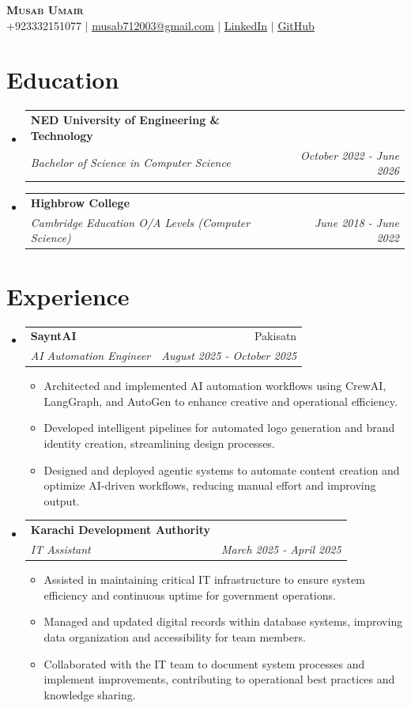 \documentclass[letterpaper,11pt]{article}
\makeatletter
\newcommand{\resumeItem}[1]{
  \item\small{
    {#1 \vspace{-2pt}}
  }
}
\newcommand{\resumeSubheading}[4]{
  \vspace{-2pt}\item
    \begin{tabular*}{0.97\textwidth}[t]{l@{\extracolsep{\fill}}r}
      \textbf{#1} & #2 \\
      \textit{\small#3} & \textit{\small #4} \\
    \end{tabular*}\vspace{-7pt}
}
\newcommand{\resumeSubHeadingListStart}{\begin{itemize}[leftmargin=0.15in, label={}]}
\newcommand{\resumeSubHeadingListEnd}{\end{itemize}}
\newcommand{\resumeItemListStart}{\begin{itemize}}
\newcommand{\resumeItemListEnd}{\end{itemize}\vspace{-5pt}}
\makeatother
\begin{document}
\begin{center}
    \textbf{\Huge \scshape Musab Umair} \\ \vspace{1pt}
    \small +923332151077 $|$ \href{mailto:musab712003@gmail.com}{\underline{musab712003@gmail.com}} $|$ 
    \href{https://www.linkedin.com/in/musab-umair1}{\underline{LinkedIn}} $|$
    \href{https://github.com/Musab712}{\underline{GitHub}}
\end{center}


\section{Education}
  \resumeSubHeadingListStart
        \resumeSubheading
      {NED University of Engineering \& Technology}{}
      {Bachelor of Science in Computer Science}{October 2022 - June 2026}
        \resumeSubheading
      {Highbrow College}{}
      {Cambridge Education O/A Levels (Computer Science)}{June 2018 - June 2022}
      \resumeSubHeadingListEnd


\section{Experience}
  \resumeSubHeadingListStart
        \resumeSubheading
      {SayntAI}{Pakisatn}
      {AI Automation Engineer}{August 2025 - October 2025}
      \resumeItemListStart
                \resumeItem{Architected and implemented AI automation workflows using CrewAI, LangGraph, and AutoGen to enhance creative and operational efficiency.}
                \resumeItem{Developed intelligent pipelines for automated logo generation and brand identity creation, streamlining design processes.}
                \resumeItem{Designed and deployed agentic systems to automate content creation and optimize AI-driven workflows, reducing manual effort and improving output.}
              \resumeItemListEnd
        \resumeSubheading
      {Karachi Development Authority}{}
      {IT Assistant}{March 2025 - April 2025}
      \resumeItemListStart
                \resumeItem{Assisted in maintaining critical IT infrastructure to ensure system efficiency and continuous uptime for government operations.}
                \resumeItem{Managed and updated digital records within database systems, improving data organization and accessibility for team members.}
                \resumeItem{Collaborated with the IT team to document system processes and implement improvements, contributing to operational best practices and knowledge sharing.}
              \resumeItemListEnd
      \resumeSubHeadingListEnd
\end{document}
